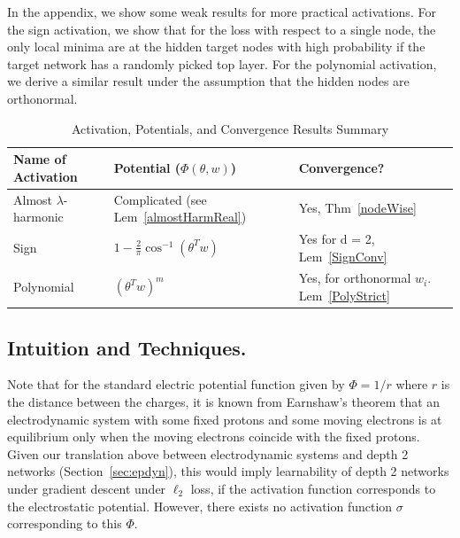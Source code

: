 In the appendix, we show some weak results for more practical activations. For the sign activation, we show that for the loss with respect to a single node, the only local minima are at the hidden target nodes with high probability if the target network has a randomly picked top layer. For the polynomial activation, we derive a similar result under the assumption that the hidden nodes are orthonormal.


 \begin{table}[h!]
 \noindent
 \vskip 0.1in
 \begin{center}
 \begin{small}
 \begin{sc}
 \begin{tabular}{
   |p{}%
   |p{}%
   |p{}|%
   }
    \hline 
         Name of Activation&  Potential  ($\Phi(\theta,w)$)    & Convergence? \\ \hline 
        Almost   $\lambda$-harmonic  & Complicated  (see Lem~\ref{almostHarmReal}) & Yes, Thm~\ref{nodeWise}\\
         Sign & $1 - \frac{2}{\pi}\cos^{-1}(\theta^Tw)$       & Yes for d = 2, Lem~\ref{SignConv} \\   
Polynomial  & $(\theta^Tw)^m$       & Yes, for orthonormal $w_i.$ Lem~\ref{PolyStrict}  \\        
         \hline
 \end{tabular}
 \end{sc}
 \end{small}
 \end{center}
 \caption{Activation, Potentials, and Convergence Results Summary}
 \label{table1}
 \end{table} 

\subsection{Intuition and Techniques.}
%
Note that for the standard electric potential function given by $\Phi = 1/r$ where $r$ is the distance between the charges, it is known from Earnshaw's theorem that an electrodynamic system with some fixed protons and some moving electrons is at equilibrium only when the moving electrons coincide with the fixed protons. Given our translation above between electrodynamic systems and depth 2 networks (Section~\ref{sec:epdyn}), this would imply learnability of depth 2 networks under gradient descent under $\ell_2$ loss, if the activation function corresponds to the electrostatic potential. However, there exists no activation function $\sigma$ corresponding to this $\Phi$.
%

